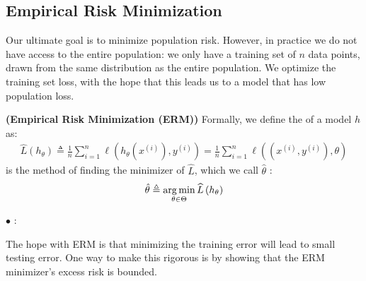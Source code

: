 \documentclass{article}
\newcommand{\bfs}[1]{\textbf{({#1}) }}
\begin{document}
\subsection{Empirical Risk Minimization}
Our ultimate goal is to minimize population risk. However, in practice we do not have access to the entire population: we only have a training set of $n$ data points, drawn from the same distribution as the entire population. We optimize the training set loss, with the hope that this leads us to a model that has low population loss.
\begin{defa}\bfs{Empirical Risk Minimization (ERM)}
 Formally, we define the  of a model $h$ as:
\begin{align*}
\widehat{L}\left(h_{\theta}\right) \triangleq \frac{1}{n} \sum_{i=1}^{n} \ell\left(h_{\theta}\left(x^{(i)}\right), y^{(i)}\right)=\frac{1}{n} \sum_{i=1}^{n} \ell\left(\left(x^{(i)}, y^{(i)}\right), \theta\right)
\end{align*}
 is the method of finding the minimizer of $\widehat{L}$, which we call $\hat{\theta}$ :
\begin{align}
\hat{\theta} \triangleq \operatorname*{arg\,min}_{\theta \in \Theta} \widehat{L}\left(h_{\theta}\right)\label{eq:erm}
\end{align}

\end{defa} 
$\bullet$  : 


The hope with ERM is that minimizing the training error will lead to small testing error. One way to make this rigorous is by showing that the ERM minimizer’s excess risk is bounded.
\end{document}
